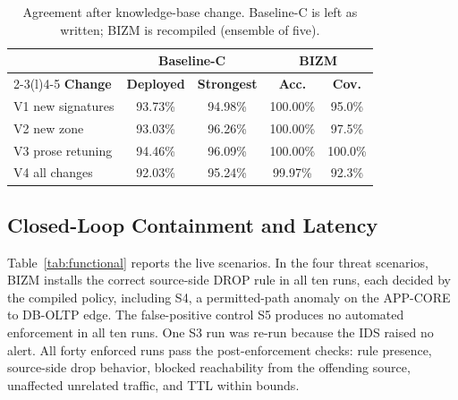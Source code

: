 \documentclass[final,5p]{elsarticle}
\begin{document}
\begin{table}[t]
    \centering
    \caption{Agreement after knowledge-base change. Baseline-C is left as written; BIZM is recompiled (ensemble of five).}
    \label{tab:drift}
    \small
    \setlength{\tabcolsep}{3.5pt}
    \begin{tabular}{@{}lcccc@{}}
        \toprule
        & \multicolumn{2}{c}{\textbf{Baseline-C}} & \multicolumn{2}{c}{\textbf{BIZM}} \\
        \cmidrule(lr){2-3}\cmidrule(l){4-5}
        \textbf{Change} & \textbf{Deployed} & \textbf{Strongest} & \textbf{Acc.} & \textbf{Cov.} \\
        \midrule
        V1 new signatures   & 93.73\% & 94.98\% & 100.00\% & 95.0\%  \\
        V2 new zone         & 93.03\% & 96.26\% & 100.00\% & 97.5\%  \\
        V3 prose retuning   & 94.46\% & 96.09\% & 100.00\% & 100.0\% \\
        V4 all changes      & 92.03\% & 95.24\% & 99.97\%  & 92.3\%  \\
        \bottomrule
    \end{tabular}
\end{table}

\subsection{Closed-Loop Containment and Latency}
\label{sec:functional_latency}

Table~\ref{tab:functional} reports the live scenarios. In the four threat scenarios, BIZM installs the correct source-side DROP rule in all ten runs, each decided by the compiled policy, including S4, a permitted-path anomaly on the APP-CORE to DB-OLTP edge. The false-positive control S5 produces no automated enforcement in all ten runs. One S3 run was re-run because the IDS raised no alert. All forty enforced runs pass the post-enforcement checks: rule presence, source-side drop behavior, blocked reachability from the offending source, unaffected unrelated traffic, and TTL within bounds.
\end{document}
